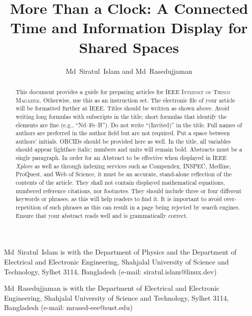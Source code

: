 \documentclass[journal,twoside,web]{IEEEmiot}
\title{More Than a Clock: A Connected Time and Information Display for Shared Spaces}
\author{Md~Siratul~Islam and Md~Rasedujjaman
}
\begin{document}
\maketitle






\begin{firstfootnote}
Md~Siratul~Islam is with the Department of Physics and the Department of Electrical and Electronic Engineering, Shahjalal University of Science and Technology, Sylhet 3114, Bangladesh (e-mail: siratul.islam@linux.dev)

Md~Rasedujjaman is with the Department of Electrical and Electronic Engineering, Shahjalal University of Science and Technology, Sylhet 3114, Bangladesh (e-mail: mrased-eee@sust.edu)
\end{firstfootnote}



\bodyfont

\begin{abstract}
This document provides a guide for preparing articles for IEEE \textsc{Internet of Things Magazine}. Otherwise, use this as an instruction set. The electronic file of your article will be formatted further at IEEE. Titles should be written as shown above. Avoid writing long formulas with subscripts in the title; short formulas that identify the elements are fine (e.g., “Nd–Fe–B”). Do not write “(Invited)” in the title. Full names of authors are preferred in the author field but are not required. Put a space between authors’ initials. ORCIDs should be provided here as well. In the title, all variables should appear lightface italic; numbers and units will remain bold. Abstracts must be a single paragraph. In order for an Abstract to be effective when displayed in IEEE \textit{Xplore} as well as through indexing services such as Compendex, INSPEC, Medline, ProQuest, and Web of Science, it must be an accurate, stand-alone reflection of the contents of the article. They shall not contain displayed mathematical equations, numbered reference citations, nor footnotes. They should include three or four different keywords or phrases, as this will help readers to find it. It is important to avoid over-repetition of such phrases as this can result in a page being rejected by search engines. Ensure that your abstract reads well and is grammatically correct.
\end{abstract}
\end{document}
